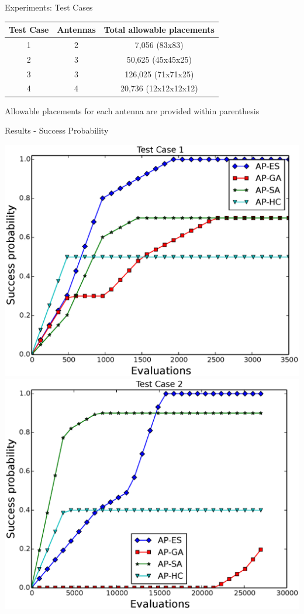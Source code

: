 \documentclass{beamer}
\begin{document}
        \begin{frame}{Experiments: Test Cases}
            \begin{table}
                \centering
                \begin{tabular}{|c|c|c|} \hline
                    Test Case&Antennas&Total allowable placements\\ \hline
                    1 & 2 & 7,056 (83x83) \\ \hline
                    2 & 3 & 50,625 (45x45x25) \\ \hline
                    3 & 3 & 126,025 (71x71x25) \\ \hline
                    4 & 4 & 20,736 (12x12x12x12) \\
                    \hline\end{tabular}
            \end{table}
            \small *Allowable placements for each antenna are provided within parenthesis
        \end{frame}

        \begin{frame}{Results - Success Probability}
            \begin{center}
                \includegraphics[width=.49\textwidth]{../paper/FIG/tc1_sp.eps}
                \includegraphics[width=.49\textwidth]{../paper/FIG/tc2_sp.eps}
            \end{center}
        \end{frame}
\end{document}
